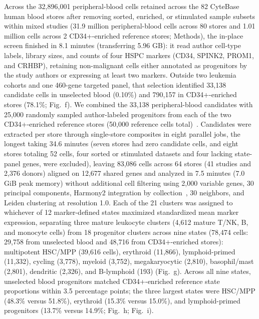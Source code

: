 \label{note:Circulating progenitor screen and integration}

Across the 32,896,001 peripheral-blood cells retained across the 82 CyteBase human blood stores after removing sorted, enriched, or stimulated sample subsets within mixed studies (31.9 million peripheral-blood cells across 80 stores and 1.01 million cells across 2 CD34+-enriched reference stores; Methods), the in-place screen finished in 8.1 minutes (transferring 5.96 GB): it read author cell-type labels, library sizes, and counts of four HSPC markers (CD34, SPINK2, PROM1, and CRHBP), retaining non-malignant cells either annotated as progenitors by the study authors or expressing at least two markers. Outside two leukemia cohorts and one 460-gene targeted panel, that selection identified 33,138 candidate cells in unselected blood (0.10\%) and 790,157 in CD34+-enriched stores (78.1\%; Fig.~f). We combined the 33,138 peripheral-blood candidates with 25,000 randomly sampled author-labeled progenitors from each of the two CD34+-enriched reference stores (50,000 reference cells total)~\cite{furer2025reference}. Candidates were extracted per store through single-store composites in eight parallel jobs, the longest taking 34.6 minutes (seven stores had zero candidate cells, and eight stores totaling 52 cells, four sorted or stimulated datasets and four lacking state-panel genes, were excluded), leaving 83,086 cells across 64 stores (41 studies and 2,376 donors) aligned on 12,677 shared genes and analyzed in 7.5 minutes (7.0 GiB peak memory) without additional cell filtering using 2,000 variable genes, 30 principal components, Harmony2 integration by collection~\cite{patikas2026integration}, 30 neighbors, and Leiden clustering at resolution 1.0. Each of the 21 clusters was assigned to whichever of 12 marker-defined states maximized standardized mean marker expression, separating three mature leukocyte clusters (4,612 mature T/NK, B, and monocyte cells) from 18 progenitor clusters across nine states (78,474 cells: 29,758 from unselected blood and 48,716 from CD34+-enriched stores): multipotent HSC/MPP (39,616 cells), erythroid (11,866), lymphoid-primed (11,332), cycling (3,778), myeloid (3,752), megakaryocytic (2,810), basophil/mast (2,801), dendritic (2,326), and B-lymphoid (193) (Fig.~g). Across all nine states, unselected blood progenitors matched CD34+-enriched reference state proportions within 3.5 percentage points; the three largest states were HSC/MPP (48.3\% versus 51.8\%), erythroid (15.3\% versus 15.0\%), and lymphoid-primed progenitors (13.7\% versus 14.9\%; Fig.~h; Fig.~i).

